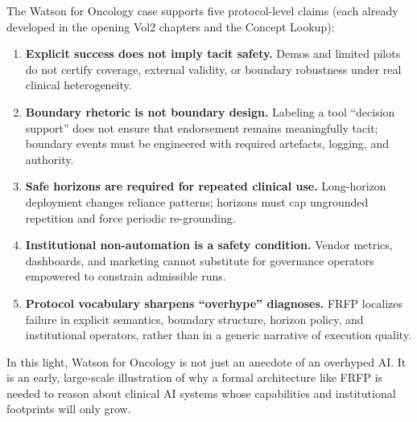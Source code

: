 The Watson for Oncology case supports five protocol-level claims (each already developed in the
opening Vol2 chapters and the Concept Lookup):
\begin{enumerate}
  \item \textbf{Explicit success does not imply tacit safety.} Demos and limited pilots do not certify
        coverage, external validity, or boundary robustness under real clinical heterogeneity.
  \item \textbf{Boundary rhetoric is not boundary design.} Labeling a tool “decision support” does not
        ensure that endorsement remains meaningfully tacit; boundary events must be engineered with
        required artefacts, logging, and authority.
  \item \textbf{Safe horizons are required for repeated clinical use.} Long-horizon deployment changes
        reliance patterns; horizons must cap ungrounded repetition and force periodic re-grounding.
  \item \textbf{Institutional non-automation is a safety condition.} Vendor metrics, dashboards, and
        marketing cannot substitute for governance operators empowered to constrain admissible runs.
  \item \textbf{Protocol vocabulary sharpens “overhype” diagnoses.} FRFP localizes failure in explicit
        semantics, boundary structure, horizon policy, and institutional operators, rather than in
        a generic narrative of execution quality.
\end{enumerate}

In this light, Watson for Oncology is not just an anecdote of an overhyped
AI.
It is an early, large-scale illustration of why a formal architecture like
FRFP is needed to reason about clinical AI systems whose capabilities and
institutional footprints will only grow.
